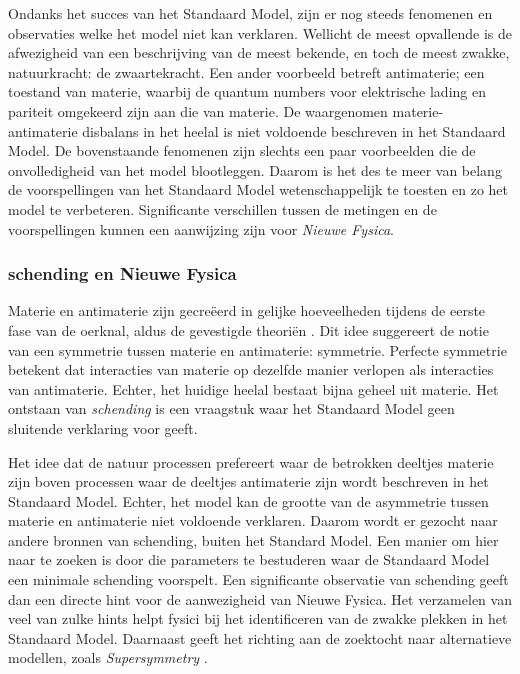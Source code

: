Ondanks het succes van het Standaard Model, zijn er nog steeds fenomenen en observaties welke het model niet kan verklaren. Wellicht de meest opvallende is de afwezigheid van een beschrijving van de meest bekende, en toch de meest zwakke, natuurkracht: de zwaartekracht. Een ander voorbeeld betreft antimaterie; een toestand van materie, waarbij de quantum numbers voor elektrische lading en pariteit omgekeerd zijn aan die van materie. De waargenomen materie-antimaterie disbalans in het heelal \cite{more-cpv-huet,more-cpv-gavela_I,more-cpv-gavela_II} is niet voldoende beschreven in het Standaard Model. De bovenstaande fenomenen zijn slechts een paar voorbeelden die de onvolledigheid van het model blootleggen. Daarom is het des te meer van belang de voorspellingen van het Standaard Model wetenschappelijk te toesten en zo het model te verbeteren. Significante verschillen tussen de metingen en de voorspellingen kunnen een aanwijzing zijn voor {\it Nieuwe Fysica}.



\subsubsection{\CP schending en Nieuwe Fysica}
Materie en antimaterie zijn gecre\"eerd in gelijke hoeveelheden tijdens de eerste fase van de oerknal, aldus de gevestigde theori\"en \cite{more-cpv-huet,more-cpv-gavela_I,more-cpv-gavela_II}. Dit idee suggereert de notie van een symmetrie tussen materie en antimaterie: \CP symmetrie. Perfecte \CP symmetrie betekent dat interacties van materie op dezelfde manier verlopen als interacties van antimaterie. Echter, het huidige heelal bestaat bijna geheel uit materie. Het ontstaan van  {\it \CP schending} is een vraagstuk waar het Standaard Model geen sluitende verklaring voor geeft.


Het idee dat de natuur processen prefereert waar de betrokken deeltjes materie zijn boven processen waar de deeltjes antimaterie zijn wordt beschreven in het Standaard Model. Echter, het model kan de grootte van de asymmetrie tussen materie en antimaterie niet voldoende verklaren. Daarom wordt er gezocht naar andere bronnen van \CP schending, buiten het Standard Model. Een manier om hier naar te zoeken is door  die parameters te bestuderen waar de Standaard Model een minimale \CP schending voorspelt. Een significante observatie van \CP schending geeft dan een directe hint voor de aanwezigheid van Nieuwe Fysica. Het verzamelen van veel van zulke hints helpt fysici bij het identificeren van de zwakke plekken in het Standaard Model. Daarnaast geeft het richting aan de zoektocht naar alternatieve modellen, zoals {\it Supersymmetry}  \eg \cite{Golfand:1971iw,Volkov:1973ix,Wess:1974tw}.



